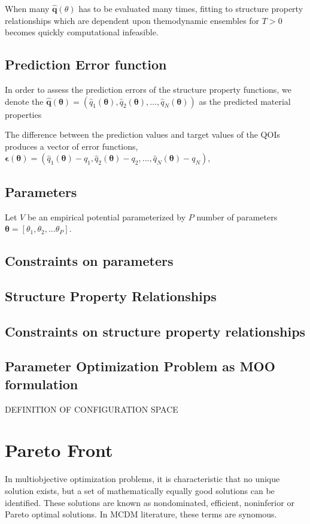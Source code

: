 When many $\hat{\bm{q}}(\theta)$ has to be evaluated many times, fitting to structure property relationships which are dependent upon themodynamic ensembles for $T>0$ becomes quickly computational infeasible.

\subsection{Prediction Error function}
In order to assess the prediction errors of the structure property functions, we denote the
      $\hat{\bm{q}}(\bm{\theta})=(
          \hat{q}_1(\bm{\theta}),
          \hat{q}_2(\bm{\theta}),
          ...,
          \hat{q}_N(\bm{\theta}))$
    as the predicted material properties

The difference between the prediction values and target values of the QOIs produces a vector of error functions, $\bm{\epsilon}(\bm{\theta})=(
        \hat{q}_1(\bm{\theta})-q_1,
        \hat{q}_2(\bm{\theta})-q_2,
        ...,
        \hat{q}_N(\bm{\theta})-q_N)$,
\subsection{Parameters}
Let $V$ be an empirical potential parameterized by $P$ number of parameters $\bm{\theta}=[\theta_1,\theta_2,...\theta_P]$.
\subsection{Constraints on parameters}
\subsection{Structure Property Relationships}
\subsection{Constraints on structure property relationships}

\subsection{Parameter Optimization Problem as MOO formulation}
DEFINITION OF CONFIGURATION SPACE


\section{Pareto Front}

In multiobjective optimization problems, it is characteristic that no unique solution exists, but a set of mathematically equally good solutions can be identified.  These solutions are known as nondominated, efficient, noninferior or Pareto optimal solutions.  In MCDM literature, these terms are synomous.

